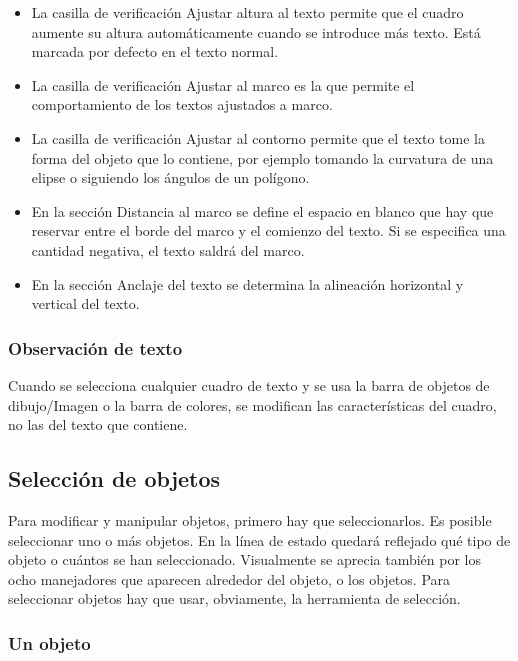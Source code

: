\begin{itemize}
\item La casilla de verificación Ajustar altura al texto permite 
que el cuadro aumente su altura automáticamente cuando se introduce 
más texto. Está marcada por defecto en el texto normal.

\item La casilla de verificación Ajustar al marco es la que permite 
el comportamiento de los textos ajustados a marco.

\item La casilla de verificación Ajustar al contorno permite que 
el texto tome la forma del objeto que lo contiene, por ejemplo 
tomando la curvatura de una elipse o siguiendo los ángulos de un 
polígono.

\item En la sección Distancia al marco se define el espacio en 
blanco que hay que reservar entre el borde del marco y el comienzo 
del texto. Si se especifica una cantidad negativa, el texto 
saldrá del marco.

\item En la sección Anclaje del texto se determina la alineación 
horizontal y vertical del texto.
\end{itemize}

\subsubsection{Observación de texto}

Cuando se selecciona cualquier cuadro de texto y se usa la barra de
objetos de dibujo/Imagen o la barra de colores, se modifican las
características del cuadro, no las del texto que contiene.

\subsection{Selección de objetos}

Para modificar y manipular objetos, primero hay que seleccionarlos. Es
posible seleccionar uno o más objetos. En la línea de estado quedará
reflejado qué tipo de objeto o cuántos se han
seleccionado. Visualmente se aprecia también por los ocho manejadores
que aparecen alrededor del objeto, o los objetos. Para seleccionar
objetos hay que usar, obviamente, la herramienta de selección.

\subsubsection{Un objeto}

